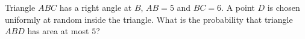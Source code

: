 Triangle $ABC$ has a right angle at $B$, $AB=5$ and $BC=6$. A point $D$ is chosen uniformly at random inside the triangle. What is the probability that triangle $ABD$ has area at most $5$?
